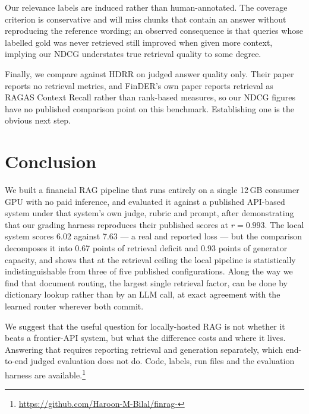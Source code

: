 \documentclass[conference]{IEEEtran}
\begin{document}
Our relevance labels are induced rather than human-annotated. The coverage
criterion is conservative and will miss chunks that contain an answer without
reproducing the reference wording; an observed consequence is that queries
whose labelled gold was never retrieved still improved when given more context,
implying our NDCG understates true retrieval quality to some degree.

Finally, we compare against HDRR on judged answer quality only. Their paper
reports no retrieval metrics, and FinDER's own paper reports retrieval as RAGAS
Context Recall rather than rank-based measures, so our NDCG figures have no
published comparison point on this benchmark. Establishing one is the obvious
next step.

\section{Conclusion}
We built a financial RAG pipeline that runs entirely on a single 12\,GB
consumer GPU with no paid inference, and evaluated it against a published
API-based system under that system's own judge, rubric and prompt, after
demonstrating that our grading harness reproduces their published scores at
$r=0.993$. The local system scores 6.02 against 7.63 --- a real and reported
loss --- but the comparison decomposes it into 0.67 points of retrieval
deficit and 0.93 points of generator capacity, and shows that at the retrieval
ceiling the local pipeline is statistically indistinguishable from three of five
published configurations. Along the way we find that document routing, the
largest single retrieval factor, can be done by dictionary lookup rather than
by an LLM call, at exact agreement with the learned router wherever both
commit.

We suggest that the useful question for locally-hosted RAG is not whether it
beats a frontier-API system, but what the difference costs and where it lives.
Answering that requires reporting retrieval and generation separately, which
end-to-end judged evaluation does not do. Code, labels, run files and the
evaluation harness are
available.\footnote{\url{https://github.com/Haroon-M-Bilal/finrag-}}
\end{document}
